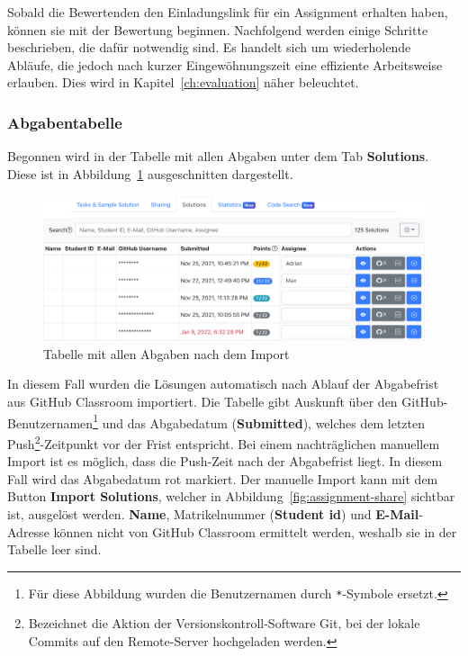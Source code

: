 Sobald die Bewertenden den Einladungslink für ein Assignment erhalten haben, können sie mit der Bewertung beginnen.
Nachfolgend werden einige Schritte beschrieben, die dafür notwendig sind.
Es handelt sich um wiederholende Abläufe, die jedoch nach kurzer Eingewöhnungszeit eine effiziente Arbeitsweise erlauben.
Dies wird in Kapitel~\ref{ch:evaluation} näher beleuchtet.

\subsubsection{Abgabentabelle}

Begonnen wird in der Tabelle mit allen Abgaben unter dem Tab \textbf{Solutions}.
Diese ist in Abbildung~\ref{fig:assignment-solutions-table} ausgeschnitten dargestellt.

\begin{figure}
    \centering
    \includegraphics[width=\textwidth]{images/assignment-solutions-table}
    \caption{Tabelle mit allen Abgaben nach dem Import}
    \label{fig:assignment-solutions-table}
\end{figure}

In diesem Fall wurden die Lösungen automatisch nach Ablauf der Abgabefrist aus GitHub Classroom importiert.
Die Tabelle gibt Auskunft über den GitHub-Benutzernamen\footnote{
    Für diese Abbildung wurden die Benutzernamen durch \texttt{*}-Symbole ersetzt.
} und das Abgabedatum (\textbf{Submitted}), welches dem letzten Push\footnote{
    Bezeichnet die Aktion der Versionskontroll-Software Git, bei der lokale Commits auf den Remote-Server hochgeladen werden.
}-Zeitpunkt vor der Frist entspricht.
Bei einem nachträglichen manuellem Import ist es möglich, dass die Push-Zeit nach der Abgabefrist liegt.
In diesem Fall wird das Abgabedatum rot markiert.
Der manuelle Import kann mit dem Button \textbf{Import Solutions}, welcher in Abbildung~\ref{fig:assignment-share} sichtbar ist, ausgelöst werden.
\textbf{Name}, Matrikelnummer (\textbf{Student \acs{id}}) und \textbf{E-Mail}-Adresse können nicht von GitHub Classroom ermittelt werden, weshalb sie in der Tabelle leer sind.

